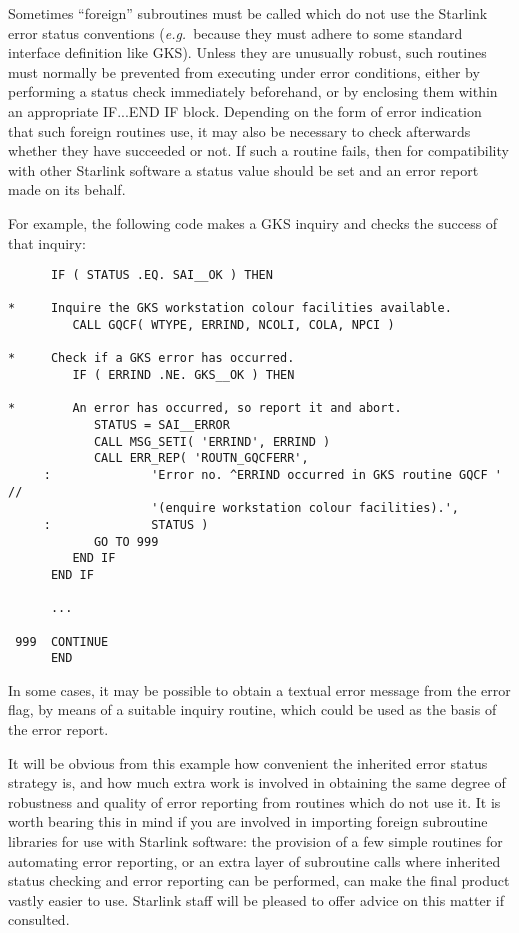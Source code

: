 \documentclass[twoside,11pt]{article}
\renewcommand{\_}{\texttt{\symbol{95}}}
\begin{document}
Sometimes ``foreign'' subroutines must be called which do not use the
Starlink error status conventions (\textit{e.g.}\ because they must adhere to some
standard interface definition like GKS).
Unless they are unusually robust, such routines must normally be prevented
from executing under error conditions, either by performing a status check
immediately beforehand, or by enclosing them within an appropriate IF...END
IF block.
Depending on the form of error indication that such foreign routines use, it
may also be necessary to check afterwards whether they have succeeded or
not.
If such a routine fails, then for compatibility with other Starlink
software a status value should be set and an error report made on its
behalf.

For example, the following code makes a GKS inquiry and checks the
success of that inquiry:

\begin {small}
\begin{verbatim}
      IF ( STATUS .EQ. SAI__OK ) THEN

*     Inquire the GKS workstation colour facilities available.
         CALL GQCF( WTYPE, ERRIND, NCOLI, COLA, NPCI )

*     Check if a GKS error has occurred.
         IF ( ERRIND .NE. GKS__OK ) THEN

*        An error has occurred, so report it and abort.
            STATUS = SAI__ERROR
            CALL MSG_SETI( 'ERRIND', ERRIND )
            CALL ERR_REP( 'ROUTN_GQCFERR',
     :              'Error no. ^ERRIND occurred in GKS routine GQCF ' //
                    '(enquire workstation colour facilities).',
     :              STATUS )
            GO TO 999
         END IF
      END IF

      ...

 999  CONTINUE
      END
\end{verbatim}
\end {small}

In some cases, it may be possible to obtain a textual error message from the
error flag, by means of a suitable inquiry routine, which could be used as
the basis of the error report.

It will be obvious from this example how convenient the inherited error
status strategy is, and how much extra work is involved in obtaining the
same degree of robustness and quality of error reporting from routines
which do not use it.
It is worth bearing this in mind if you are involved in importing foreign
subroutine libraries for use with Starlink software: the provision of a few
simple routines for automating error reporting, or an extra layer of
subroutine calls where inherited status checking and error reporting can be
performed, can make the final product vastly easier to use.
Starlink staff will be pleased to offer advice on this matter if consulted.
\end{document}
